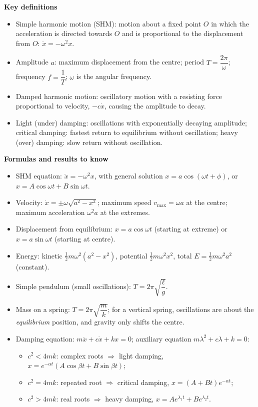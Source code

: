 \documentclass[11pt]{article}
\newcommand{\cle}[1]{{\popxbold\color{popdark}#1}}
\begin{document}
\begin{bilan}
\textbf{Key definitions}
\begin{itemize}
\item \cle{Simple harmonic motion} (SHM): motion about a fixed point $O$ in which the acceleration is directed towards $O$ and is proportional to the displacement from $O$: $\ddot{x}=-\omega^2 x$.
\item \cle{Amplitude} $a$: maximum displacement from the centre; \cle{period} $T=\dfrac{2\pi}{\omega}$; \cle{frequency} $f=\dfrac{1}{T}$; $\omega$ is the angular frequency.
\item \cle{Damped harmonic motion}: oscillatory motion with a resisting force proportional to velocity, $-c\dot{x}$, causing the amplitude to decay.
\item \cle{Light (under) damping}: oscillations with exponentially decaying amplitude; \cle{critical damping}: fastest return to equilibrium without oscillation; \cle{heavy (over) damping}: slow return without oscillation.
\end{itemize}

\textbf{Formulas and results to know}
\begin{itemize}
\item SHM equation: $\ddot{x}=-\omega^2 x$, with general solution $x=a\cos(\omega t+\phi)$, or $x=A\cos\omega t+B\sin\omega t$.
\item Velocity: $\dot{x}=\pm\omega\sqrt{a^2-x^2}$; maximum speed $v_{\max}=\omega a$ at the centre; maximum acceleration $\omega^2 a$ at the extremes.
\item Displacement from equilibrium: $x=a\cos\omega t$ (starting at extreme) or $x=a\sin\omega t$ (starting at centre).
\item Energy: kinetic $\tfrac12 m\omega^2(a^2-x^2)$, potential $\tfrac12 m\omega^2 x^2$, total $E=\tfrac12 m\omega^2 a^2$ (constant).
\item Simple pendulum (small oscillations): $T=2\pi\sqrt{\dfrac{\ell}{g}}$.
\item Mass on a spring: $T=2\pi\sqrt{\dfrac{m}{k}}$; for a vertical spring, oscillations are about the \emph{equilibrium} position, and gravity only shifts the centre.
\item Damping equation: $m\ddot{x}+c\dot{x}+kx=0$; auxiliary equation $m\lambda^2+c\lambda+k=0$:
  \begin{itemize}
  \item $c^2<4mk$: complex roots $\Rightarrow$ light damping, $x=e^{-\alpha t}(A\cos\beta t+B\sin\beta t)$;
  \item $c^2=4mk$: repeated root $\Rightarrow$ critical damping, $x=(A+Bt)e^{-\alpha t}$;
  \item $c^2>4mk$: real roots $\Rightarrow$ heavy damping, $x=Ae^{\lambda_1 t}+Be^{\lambda_2 t}$.
  \end{itemize}
\end{itemize}


\end{bilan}
\end{document}
